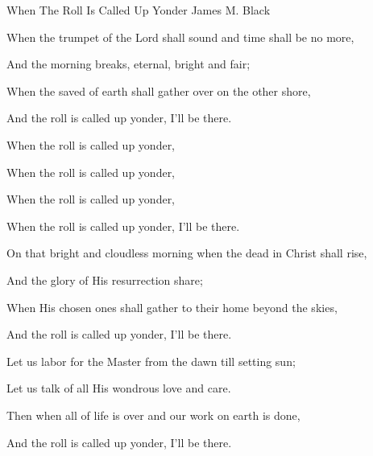 \documentclass[12pt]{book}
\begin{document}
\begin{song}{When The Roll Is Called Up Yonder}{}
  {\SBPubDom}
  {James M. Black}
  {}
  {}

  \begin{SBVerse}
    When the trumpet of the Lord shall sound and time shall be no more,

    And the morning breaks, eternal, bright and fair;

    When the saved of earth shall gather over on the other shore,

    And the roll is called up yonder, I'll be there.
  \end{SBVerse}

  \begin{SBOpGroup}
    When the roll is called up yonder,

    When the roll is called up yonder,

    When the roll is called up yonder,

    When the roll is called up yonder, I'll be there.
  \end{SBOpGroup}

  \begin{SBVerse}
    On that bright and cloudless morning when the dead in Christ shall rise,

    And the glory of His resurrection share;

    When His chosen ones shall gather to their home beyond the skies,

    And the roll is called up yonder, I'll be there.
  \end{SBVerse}

  \begin{SBVerse}
    Let us labor for the Master from the dawn till setting sun;

    Let us talk of all His wondrous love and care.

    Then when all of life is over and our work on earth is done,

    And the roll is called up yonder, I'll be there.
  \end{SBVerse}
\end{song}
\end{document}
